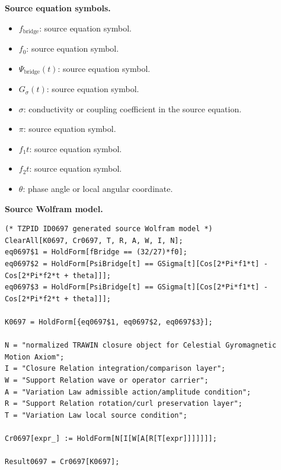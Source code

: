 \begin{minipage}[t]{0.49\linewidth}
\begingroup
\small
\raggedright
\textbf{Source equation symbols.}\par
\begin{itemize}[leftmargin=1.35em,itemsep=1pt,topsep=1pt,parsep=0pt]
    \item $f_{\mathrm{bridge}}$: source equation symbol.
    \item $f_0$: source equation symbol.
    \item $\Psi_{\mathrm{bridge}}(t)$: source equation symbol.
    \item $G_{\sigma}(t)$: source equation symbol.
    \item $\sigma$: conductivity or coupling coefficient in the source equation.
    \item $\pi$: source equation symbol.
    \item $f_1t$: source equation symbol.
    \item $f_2t$: source equation symbol.
    \item $\theta$: phase angle or local angular coordinate.
\end{itemize}
\endgroup
\end{minipage}\hfill
\begin{minipage}[t]{0.47\linewidth}
\begingroup
\scriptsize
\raggedright
\textbf{Source Wolfram model.}\par
\begin{Verbatim}[fontsize=\tiny,breaklines=true,breakanywhere=true]
(* TZPID ID0697 generated source Wolfram model *)
ClearAll[K0697, Cr0697, T, R, A, W, I, N];
eq0697$1 = HoldForm[fBridge == (32/27)*f0];
eq0697$2 = HoldForm[PsiBridge[t] == GSigma[t][Cos[2*Pi*f1*t] - Cos[2*Pi*f2*t + theta]]];
eq0697$3 = HoldForm[PsiBridge[t] == GSigma[t][Cos[2*Pi*f1*t] - Cos[2*Pi*f2*t + theta]]];

K0697 = HoldForm[{eq0697$1, eq0697$2, eq0697$3}];

N = "normalized TRAWIN closure object for Celestial Gyromagnetic Motion Axiom";
I = "Closure Relation integration/comparison layer";
W = "Support Relation wave or operator carrier";
A = "Variation Law admissible action/amplitude condition";
R = "Support Relation rotation/curl preservation layer";
T = "Variation Law local source condition";

Cr0697[expr_] := HoldForm[N[I[W[A[R[T[expr]]]]]]];

Result0697 = Cr0697[K0697];
\end{Verbatim}
\endgroup
\end{minipage}

